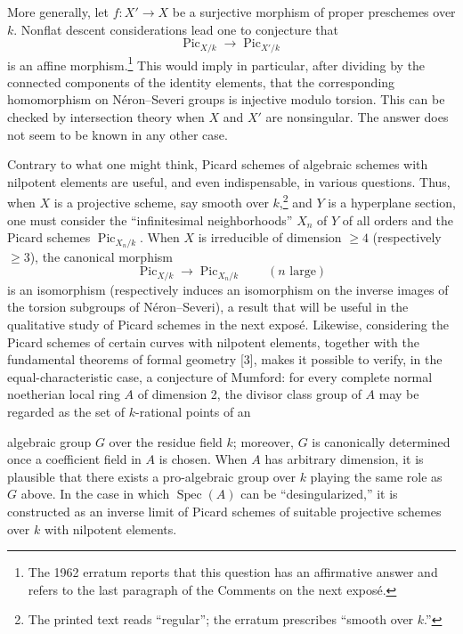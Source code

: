  More generally, let $f:X'\longrightarrow X$ be a
surjective morphism of proper preschemes over $k$. Nonflat descent
considerations lead one to conjecture that
\[
\operatorname{Pic}_{X/k}\longrightarrow\operatorname{Pic}_{X'/k}
\]
is an affine morphism.\footnote{The 1962 erratum reports that this question has
an affirmative answer and refers to the last paragraph of the Comments on the
next exposé.} This would imply in particular, after dividing by the connected
components of the identity elements, that the corresponding homomorphism on
Néron--Severi groups is injective modulo torsion. This can be checked by
intersection theory when $X$ and $X'$ are nonsingular. The answer does not
seem to be known in any other case.

 Contrary to what one might think, Picard schemes of
algebraic schemes with nilpotent elements are useful, and even indispensable,
in various questions. Thus, when $X$ is a projective scheme, say smooth over
$k$,\footnote{The printed text reads “regular”; the erratum prescribes “smooth
over $k$.”} and $Y$ is a hyperplane section, one must consider the
“infinitesimal neighborhoods” $X_n$ of $Y$ of all orders and the Picard
schemes $\operatorname{Pic}_{X_n/k}$. When $X$ is irreducible of dimension
$\geq4$ (respectively $\geq3$), the canonical morphism
\[
\operatorname{Pic}_{X/k}\longrightarrow\operatorname{Pic}_{X_n/k}
\qquad(n\text{ large})
\]
is an isomorphism (respectively induces an isomorphism on the inverse images
of the torsion subgroups of Néron--Severi), a result that will be useful in the
qualitative study of Picard schemes in the next exposé. Likewise, considering
the Picard schemes of certain curves with nilpotent elements, together with
the fundamental theorems of formal geometry [3], makes it possible to verify,
in the equal-characteristic case, a conjecture of Mumford: for every complete
normal noetherian local ring $A$ of dimension 2, the divisor class group of
$A$ may be regarded as the set of $k$-rational points of an

algebraic group $G$ over the residue field $k$; moreover, $G$ is canonically
determined once a coefficient field in $A$ is chosen. When $A$ has arbitrary
dimension, it is plausible that there exists a pro-algebraic group over $k$
playing the same role as $G$ above. In the case in which
$\operatorname{Spec}(A)$ can be “desingularized,” it is constructed as an
inverse limit of Picard schemes of suitable projective schemes over $k$ with
nilpotent elements.

